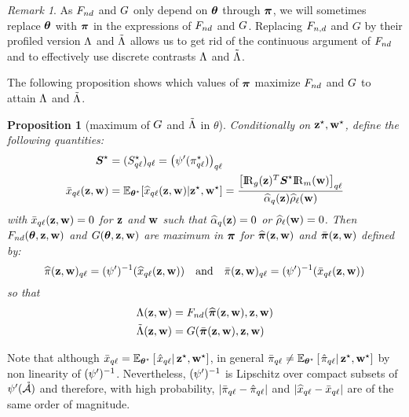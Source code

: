 \documentclass[]{imsart}
\newcommand{\1}{\mathds{1}}
\numberwithin{equation}{section}
\theoremstyle{plain}
\newtheorem{proposition}[thm]{Proposition}
\theoremstyle{remark}
\newtheorem{rem}[thm]{Remark}
\begin{document}
\begin{rem}
As  $F_{nd}$ and $G$ only depend on $\boldsymbol{\theta}$ through $\boldsymbol{\pi}$, we will sometimes replace $\boldsymbol{\theta}$ with $\boldsymbol{\pi}$ in the expressions of $F_{nd}$ and $G$. Replacing $F_{n,d}$ and $G$ by their profiled version $\Lambda$ and $\tilde{\Lambda}$ allows us to get rid of the continuous argument of $F_{nd}$ and to effectively use discrete contrasts $\Lambda$ and $\tilde{\Lambda}$.
\end{rem}

The following proposition shows which values of $\boldsymbol{\pi}$ maximize $F_{nd}$ and $G$ to attain $\Lambda$ and $\tilde{\Lambda}$.
\begin{proposition}[maximum of $G$ and $\tilde{\Lambda}$ in $\theta$]
\label{prop:profile-likelihood}
Conditionally on  $\mathbf{z}^\star, \mathbf{w}^\star$, define
the following quantities:
\begin{equation}
  \label{eq:profile-likelihood-notations}
  \begin{aligned}
    \Sal & = (\Salkl)_{\kk\el} = \left( \normp(\alskl) \right)_{\kk\el} \\
    \barxkl(\bz, \bw) & = \Esp_{\bthetas}[\hxklzw | \bzs, \bws] = \frac{\left[ \Rgbz\transpose \Sal \Rmbw \right]_{\kk\el}}{\pizk\rhowl}
  \end{aligned}
\end{equation}
with $\bar{x}_{q\ell}(\mathbf{z}, \mathbf{w})=0$ for $\mathbf{z}$ and $\mathbf{w}$ such that $\widehat{\alpha}_{q}(\mathbf{z})=0$ or $\widehat{\rho}_{\ell}(\mathbf{w})=0$. 
Then $F_{nd}(\boldsymbol{\theta}, \mathbf{z}, \mathbf{w})$ and $G(\boldsymbol{\theta}, \mathbf{z}, \mathbf{w})$ are maximum in $\boldsymbol{\pi}$ for  $\widehat{\boldsymbol{\pi}}(\mathbf{z}, \mathbf{w})$ and $\bar{\boldsymbol{\pi}}(\mathbf{z}, \mathbf{w})$ defined by:
\begin{equation*}
  \hal(\bz, \bw)_{\kk\el} = \normpm ( \hxklzw ) \quad \text{and} \quad \bar{\al}(\bz, \bw)_{\kk\el} = \normpm ( \barxkl(\bz, \bw) )
\end{equation*}
so that
\begin{equation*}
  \begin{aligned}
    \Lamb(\bz, \bw) & = \Fnd(\hbal(\bz, \bw), \bz, \bw) %
    \\
    \Lambtilde(\bz, \bw) & = \G(\bar{\bal}(\bz, \bw), \bz, \bw) %
  \end{aligned}
\end{equation*}
\end{proposition}
Note that although $\bar{x}_{q\ell} = \mathbb{E}_{\boldsymbol{\theta}^\star}\left[\left.\hat{x}_{q\ell}\right|\mathbf{z}^\star,\mathbf{w}^\star\right]$, in general %
$\bar{\pi}_{q\ell} \neq \mathbb{E}_{\boldsymbol{\theta}^\star}\left[\left.\hat{\pi}_{q\ell}\right|\mathbf{z}^\star,\mathbf{w}^\star\right]$ by non linearity of $(\psi')^{-1}$. Nevertheless, $(\psi')^{-1}$ is Lipschitz over compact subsets of $\psi'(\mathring{\mathcal{A}})$ and therefore, with high probability, $|\bar{\pi}_{q\ell} - \hat{\pi}_{q\ell}|$ and $|\widehat{x}_{q\ell} - \bar{x}_{q\ell}|$ are of the same order of magnitude. 
\end{document}
